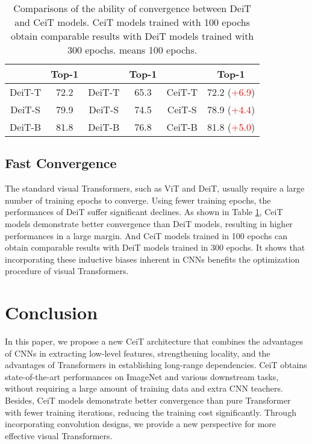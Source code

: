 \documentclass[10pt,twocolumn,letterpaper]{article}
\begin{document}
\begin{table}[t]
   \centering
   \footnotesize
   \caption{Comparisons of the ability of convergence between DeiT and CeiT models. CeiT models trained with 100 epochs obtain comparable results with DeiT models trained with 300 epochs.  means 100 epochs.}
   \begin{tabular}{cc|cc|cc}
       \toprule
        & Top-1 &  & Top-1 &  & Top-1\\
       \midrule
       DeiT-T & 72.2 & DeiT-T & 65.3 & CeiT-T & 72.2 (\textcolor{Red}{+6.9}) \\
       DeiT-S & 79.9 & DeiT-S & 74.5 & CeiT-S & 78.9 (\textcolor{Red}{+4.4}) \\
       DeiT-B & 81.8 & DeiT-B & 76.8 & CeiT-B & 81.8 (\textcolor{Red}{+5.0}) \\
       \bottomrule
   \end{tabular}
   \label{tab:convergence}
\end{table}

\subsection{Fast Convergence}\label{sec:exp_fast}

The standard visual Transformers, such as ViT and DeiT, usually require a large number of training epochs to converge. Using  fewer training epochs, the performances of DeiT suffer significant declines. As shown in Table \ref{tab:convergence}, CeiT models demonstrate better convergence than DeiT models, resulting in higher performances in a large margin. And CeiT models trained in 100 epochs can obtain comparable results with DeiT models trained in 300 epochs. It shows that incorporating these inductive biases inherent in CNNs benefits the optimization procedure of visual Transformers. 

\section{Conclusion}

In this paper, we propose a new CeiT architecture that combines the advantages of CNNs in extracting low-level features, strengthening locality, and the advantages of Transformers in establishing long-range dependencies. CeiT obtains state-of-the-art performances on ImageNet and various downstream tasks, without requiring a large amount of training data and extra CNN teachers. Besides, CeiT models demonstrate better convergence than pure Transformer with  fewer training iterations, reducing the training cost significantly. Through incorporating convolution designs, we provide a new perspective for more effective visual Transformers.

{\small


}
\end{document}
